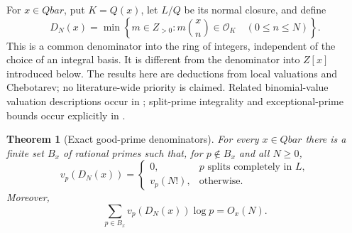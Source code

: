 \documentclass[11pt,a4paper]{article}
\newcommand{\Q}{\mathbb Q}
\newcommand{\Z}{\mathbb Z}
\newcommand{\QB}{\overline{\mathbb Q}}
\newcommand{\Qbar}{\overline{\mathbb Q}}
\newtheorem{theorem}{Theorem}[section]
\theoremstyle{definition}
\theoremstyle{remark}
\theoremstyle{plain}
\numberwithin{equation}{section}
\def\Qbar{Qbar}\def\QB{Qbar}\def\mathbb#1{#1}%
\begin{document}
For $x\in\Qbar$, put $K=\Q(x)$, let $L/\Q$ be its normal closure,
and define
\[
 D_N(x)=\min\left\{m\in\Z_{>0}:
       m\binom{x}{n}\in\mathcal O_K\quad(0\le n\le N)\right\}.
\]
This is a common denominator into the ring of integers, independent of
the choice of an integral basis.  It is different from the denominator
into $\Z[x]$ introduced below.  The results here are deductions from
local valuations and Chebotarev; no literature-wide priority is claimed.
Related binomial-value valuation descriptions occur in
\cite[Sections 5--6]{KM}; split-prime integrality and exceptional-prime
bounds occur explicitly in \cite[Lemma 4.4]{FP}.

\begin{theorem}[Exact good-prime denominators]
\label{em:thm:binomial-local}
For every $x\in\Qbar$ there is a finite set $B_x$ of rational primes
such that, for $p\notin B_x$ and all $N\ge0$,
\[
 v_p(D_N(x))=
 \begin{cases}
 0,&p\text{ splits completely in }L,\\
 v_p(N!),&\text{otherwise}.
 \end{cases}
\]
Moreover,
\[
 \sum_{p\in B_x}v_p(D_N(x))\log p=O_x(N).
\]
\end{theorem}
\end{document}

